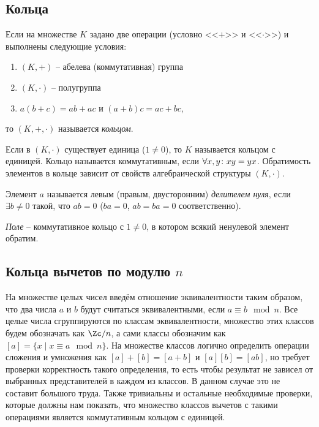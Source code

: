 \subsection{Кольца}

\begin{df}
  Если на множестве $K$ задано две операции (условно <<$+$>> и <<$\cdot$>>) и выполнены следующие условия:
  \begin{enumerate}
    \item $(K,+)$ -- абелева (коммутативная) группа
    \item $(K,\cdot)$ -- полугруппа
    \item $a(b+c)=ab+ac$ и $(a+b)c=ac+bc$,
  \end{enumerate}
  то $(K,+,\cdot)$ называется \emph{кольцом}.
  
  Если в $(K,\cdot)$ существует единица ($1\ne0$), то $K$ называется кольцом с единицей. Кольцо называется коммутативным, если $\forall x,y\colon xy=yx$. Обратимость элементов в кольце зависит от свойств алгебраической структуры $(K,\cdot)$.
\end{df}

\begin{df}
  Элемент $a$ называется левым (правым, двусторонним) \emph{делителем нуля}, если $\exists b\ne0$ такой, что $ab=0$ ($ba=0$, $ab=ba=0$ соответственно).
\end{df}

\begin{df}
  \emph{Поле} -- коммутативное кольцо с $1\ne0$, в котором всякий ненулевой элемент обратим.
\end{df}

\subsection{Кольца вычетов по модулю $n$}

На множестве целых чисел введём отношение эквивалентности таким
образом, что два числа $a$ и $b$ будут считаться эквивалентными, если
$a\equiv b \mod n$. Все целые числа сгруппируются по классам
эквивалентности, множество этих классов будем обозначать как $\Zc/n$,
а сами классы обозначим как $[a]=\{x\mid x\equiv a \mod n\}$. На
множестве классов логично определить операции сложения и умножения как
$[a]+[b]=[a+b]$ и $[a][b]=[ab]$, но требует проверки корректность
такого определения, то есть чтобы результат не зависел от выбранных
представителей в каждом из классов. В данном случае это не составит
большого труда. Также тривиальны и остальные необходимые проверки,
которые должны нам показать, что множество классов вычетов с такими
операциями является коммутативным кольцом с
единицей.

